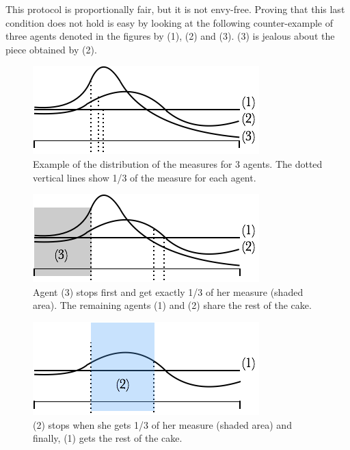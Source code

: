 This protocol is proportionally fair, but it is not envy-free. 
Proving that this last condition does not hold is easy by looking at the following counter-example
of three agents denoted in the figures by (1), (2) and (3).
(3) is jealous about the piece obtained by (2). 
\begin{figure}[htb]
\begin{center}
        \includegraphics[scale=0.6]{FiguresMaths/CakeEnvyFree1}
        \caption{Example of the distribution of the measures for 3 agents.
        The dotted vertical lines show 1/3 of the measure for each agent.}
        \label{Fig:cakeEnvyFree1}
\end{center}
\end{figure}
\begin{figure}[htb]
\begin{center}
        \includegraphics[scale=0.6]{FiguresMaths/CakeEnvyFree2}
        \caption{Agent (3) stops first and get exactly 1/3 of her measure (shaded area).
        The remaining agents (1) and (2) share the rest of the cake. }
        \label{Fig:cakeEnvyFree2}
\end{center}
\end{figure}
\begin{figure}[htb]
\begin{center}
        \includegraphics[scale=0.6]{FiguresMaths/CakeEnvyFree3}
        \caption{(2) stops when she gets 1/3 of her measure (shaded area) and finally, (1) gets the rest of the cake.}
        \label{Fig:cakeEnvyFree3}
\end{center}
\end{figure}
